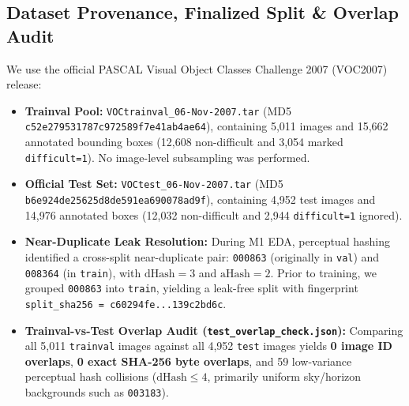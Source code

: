 \documentclass[twoside,final]{hcmut-report}
\begin{document}
\subsection{\textbf{Dataset Provenance, Finalized Split \& Overlap Audit}}
We use the official PASCAL Visual Object Classes Challenge 2007 (VOC2007) release:
\begin{itemize}
    \item \textbf{Trainval Pool:} \texttt{VOCtrainval\_06-Nov-2007.tar} (MD5 \texttt{c52e279531787c972589f7e41ab4ae64}), containing 5,011 images and 15,662 annotated bounding boxes (12,608 non-difficult and 3,054 marked \texttt{difficult=1}). No image-level subsampling was performed.
    \item \textbf{Official Test Set:} \texttt{VOCtest\_06-Nov-2007.tar} (MD5 \texttt{b6e924de25625d8de591ea690078ad9f}), containing 4,952 test images and 14,976 annotated boxes (12,032 non-difficult and 2,944 \texttt{difficult=1} ignored).
    \item \textbf{Near-Duplicate Leak Resolution:} During M1 EDA, perceptual hashing identified a cross-split near-duplicate pair: \texttt{000863} (originally in \texttt{val}) and \texttt{008364} (in \texttt{train}), with $\text{dHash}=3$ and $\text{aHash}=2$. Prior to training, we grouped \texttt{000863} into \texttt{train}, yielding a leak-free split with fingerprint \texttt{split\_sha256 = c60294fe...139c2bd6c}.
    \item \textbf{Trainval-vs-Test Overlap Audit (\texttt{test\_overlap\_check.json}):} Comparing all 5,011 \texttt{trainval} images against all 4,952 \texttt{test} images yields \textbf{0 image ID overlaps}, \textbf{0 exact SHA-256 byte overlaps}, and 59 low-variance perceptual hash collisions ($\text{dHash}\le 4$, primarily uniform sky/horizon backgrounds such as \texttt{003183}).
\end{itemize}

\begin{table}[H]
\centering
\caption{Finalized PASCAL VOC 2007 Dataset Partitions and Difficult-Object Policy}
\end{table}
\end{document}
